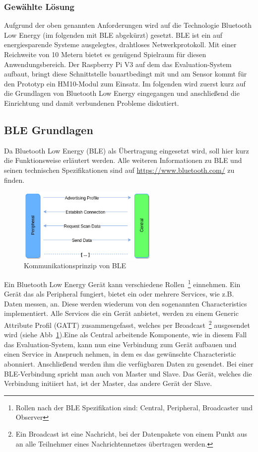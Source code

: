 \subsubsection{Gewählte Lösung}
Aufgrund der oben genannten Anforderungen wird auf die Technologie Bluetooth Low Energy (im folgenden mit BLE abgekürzt) gesetzt. BLE ist ein auf energiesparende Systeme ausgelegtes, drahtloses Netwerkprotokoll. Mit einer Reichweite von 10 Metern \cite{ble_spec} bietet es genügend Spielraum für diesen Anwendungsbereich. Der Raspberry Pi V3 auf dem das Evaluation-System aufbaut, bringt diese Schnittstelle bauartbedingt mit und am Sensor kommt für den Prototyp ein HM10-Modul zum Einsatz. Im folgenden wird zuerst kurz auf die Grundlagen von Bluetooth Low Energy eingegangen und anschließend die Einrichtung und damit verbundenen Probleme diskutiert. 

\subsection{BLE Grundlagen}
\label{subsubsec:ble_gl}
Da Bluetooth Low Energy (BLE) als Übertragung eingesetzt wird, soll hier kurz die Funktionsweise erläutert werden. Alle weiteren Informationen zu BLE und seinen technischen Spezifikationen sind auf \url{https://www.bluetooth.com/} zu finden. 

\begin{figure}[ht]
	\centering
		\includegraphics[width=0.6\textwidth]{includes/kom/graphics/ble_connection}
	\caption{Kommunikationsprinzip von BLE}
	\label{fig:ble_comm}
\end{figure}

Ein Bluetooth Low Energy Gerät kann verschiedene Rollen~\footnote{Rollen nach der BLE Spezifikation sind: Central, Peripheral, Broadcaster und Observer} einnehmen. Ein Gerät das als \glqq{}Peripheral\grqq{} fungiert, bietet ein oder mehrere Services, wie z.B. Daten messen, an. Diese werden wiederum von den sogenannten  \glqq{}Characteristics\grqq{} implementiert. Alle Services die ein Gerät anbietet, werden zu einem Generic Attribute Profil (GATT) zusammengefasst, welches per Broadcast~\footnote{Ein Broadcast ist eine Nachricht, bei der Datenpakete von einem Punkt aus an alle Teilnehmer eines Nachrichtennetzes übertragen werden. } ausgesendet wird (siehe Abb~\ref{fig:ble_comm}).Eine als \glqq{}Central\grqq{} arbeitende Komponente, wie in diesem Fall das Evaluation-System, kann nun eine Verbindung zum Gerät aufbauen und einen Service in Anspruch nehmen, in dem es das gewünschte \glqq{}Characteristic\grqq{} abonniert. Anschließend werden ihm die verfügbaren Daten zu gesendet. Bei einer BLE-Verbindung spricht man auch von Master und Slave. Das Gerät, welches die Verbindung initiiert hat, ist der Master, das andere Gerät der Slave.


